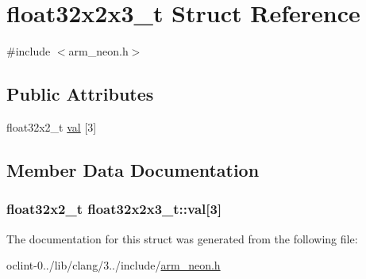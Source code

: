 \hypertarget{structfloat32x2x3__t}{\section{float32x2x3\-\_\-t Struct Reference}
\label{structfloat32x2x3__t}
}


{\ttfamily \#include $<$arm\-\_\-neon.\-h$>$}

\subsection*{Public Attributes}
\begin{DoxyCompactItemize}
\item 
float32x2\-\_\-t \hyperlink{structfloat32x2x3__t_af65473d556a44df34a9f157b224271a9}{val} \mbox{[}3\mbox{]}
\end{DoxyCompactItemize}


\subsection{Member Data Documentation}
\hypertarget{structfloat32x2x3__t_af65473d556a44df34a9f157b224271a9}{
\subsubsection[{val}]{\setlength{\rightskip}{0pt plus 5cm}float32x2\-\_\-t float32x2x3\-\_\-t\-::val\mbox{[}3\mbox{]}}}\label{structfloat32x2x3__t_af65473d556a44df34a9f157b224271a9}


The documentation for this struct was generated from the following file\-:\begin{DoxyCompactItemize}
\item 
oclint-\/0../lib/clang/3../include/\hyperlink{arm__neon_8h}{arm\-\_\-neon.\-h}\end{DoxyCompactItemize}
